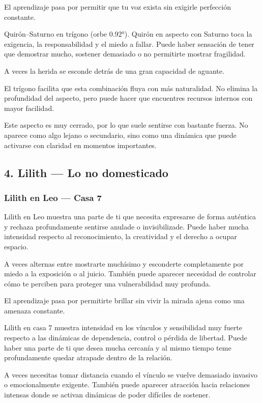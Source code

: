 \documentclass[11pt,a4paper]{article}
\begin{document}
El aprendizaje pasa por permitir que tu voz exista sin exigirle perfección constante.

Quirón–Saturno en trígono (orbe 0.92°).
Quirón en aspecto con Saturno toca la exigencia, la responsabilidad y el miedo a fallar. Puede haber sensación de tener que demostrar mucho, sostener demasiado o no permitirte mostrar fragilidad.

A veces la herida se esconde detrás de una gran capacidad de aguante.

El trígono facilita que esta combinación fluya con más naturalidad. No elimina la profundidad del aspecto, pero puede hacer que encuentres recursos internos con mayor facilidad.

Este aspecto es muy cerrado, por lo que suele sentirse con bastante fuerza. No aparece como algo lejano o secundario, sino como una dinámica que puede activarse con claridad en momentos importantes.

\vspace{0.8cm}

\subsection{4. Lilith — Lo no domesticado}

\subsubsection*{Lilith en Leo — Casa 7}

Lilith en Leo muestra una parte de ti que necesita expresarse de forma auténtica y rechaza profundamente sentirse anulade o invisibilizade. Puede haber mucha intensidad respecto al reconocimiento, la creatividad y el derecho a ocupar espacio.

A veces alternas entre mostrarte muchísimo y esconderte completamente por miedo a la exposición o al juicio. También puede aparecer necesidad de controlar cómo te perciben para proteger una vulnerabilidad muy profunda.

El aprendizaje pasa por permitirte brillar sin vivir la mirada ajena como una amenaza constante.

Lilith en casa 7 muestra intensidad en los vínculos y sensibilidad muy fuerte respecto a las dinámicas de dependencia, control o pérdida de libertad. Puede haber una parte de ti que desea mucha cercanía y al mismo tiempo teme profundamente quedar atrapade dentro de la relación.

A veces necesitas tomar distancia cuando el vínculo se vuelve demasiado invasivo o emocionalmente exigente. También puede aparecer atracción hacia relaciones intensas donde se activan dinámicas de poder difíciles de sostener.
\end{document}
